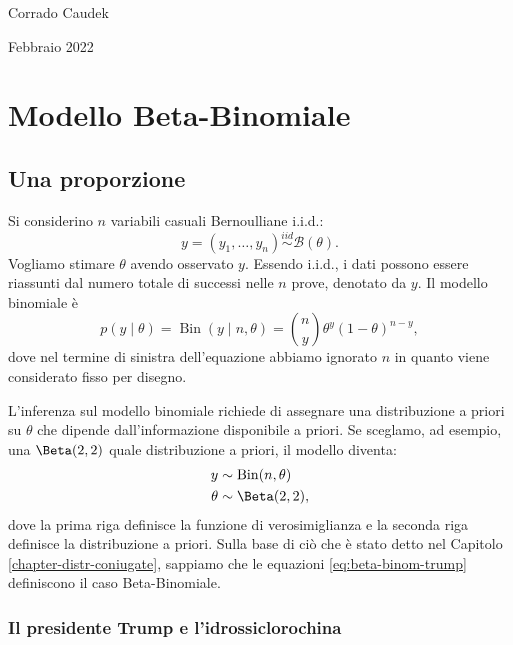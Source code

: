 \documentclass[
  11pt,
  italian,
  a4paper,
  extrafontsizes,onecolumn,openright
  ]{memoir}
\DeclareMathOperator{\Bin}{Bin} %
\begin{document}
Corrado Caudek

\bigskip

Febbraio 2022

\mainmatter

\hypertarget{mod-binom}{%
\chapter{Modello Beta-Binomiale}\label{mod-binom}}

\hypertarget{una-proporzione}{%
\section{Una proporzione}\label{una-proporzione}}

Si considerino \(n\) variabili casuali Bernoulliane i.i.d.:
\[
y = (y_1, \dots, y_n) \stackrel{iid}{\sim} \mathcal{B}(\theta).
\]
\noindent
Vogliamo stimare \(\theta\) avendo osservato \(y\). Essendo i.i.d., i dati possono essere riassunti dal numero totale di successi nelle \(n\) prove, denotato da \(y\). Il modello binomiale è
\begin{equation}
p(y \mid \theta) = \Bin(y \mid n, \theta) = \binom{n}{y}\theta^y (1 -\theta)^{n-y},
\end{equation}
\noindent
dove nel termine di sinistra dell'equazione abbiamo ignorato \(n\) in quanto viene considerato fisso per disegno.

L'inferenza sul modello binomiale richiede di assegnare una distribuzione a priori su \(\theta\) che dipende dall'informazione disponibile a priori. Se sceglamo, ad esempio, una \(\Beta(2, 2)\) quale distribuzione a priori, il modello diventa:
\begin{align}
y &\sim \Bin(n, \theta) \notag\\
\theta &\sim \Beta(2, 2),
\label{eq:beta-binom-trump}
\end{align}
\noindent
dove la prima riga definisce la funzione di verosimiglianza e la seconda riga definisce la distribuzione a priori. Sulla base di ciò che è stato detto nel Capitolo \ref{chapter-distr-coniugate}, sappiamo che le equazioni \eqref{eq:beta-binom-trump} definiscono il caso Beta-Binomiale.

\hypertarget{il-presidente-trump-e-lidrossiclorochina}{%
\subsection{Il presidente Trump e l'idrossiclorochina}\label{il-presidente-trump-e-lidrossiclorochina}}
\end{document}
